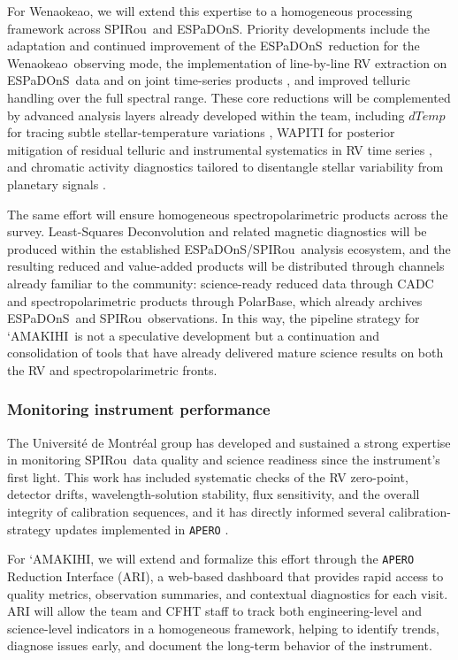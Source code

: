 \documentclass[
    traditabstract,
    longauth,
    onecolumn,
]{aa}
\def \amakihi{`AMAKIHI}
\def \spi{SPIRou}
\def \esp{ESPaDOnS}
\def \wena{Wenaokeao}
\begin{document}
For \wena, we will extend this expertise to a homogeneous processing framework across \spi\ and \esp. Priority developments include the adaptation and continued improvement of the \esp\ reduction for the \wena\ observing mode, the implementation of line-by-line RV extraction on \esp\ data and on joint time-series products \citep{artigau_line-by-line_2022}, and improved telluric handling over the full spectral range. These core reductions will be complemented by advanced analysis layers already developed within the team, including $dTemp$ for tracing subtle stellar-temperature variations \citep{artigau_measuring_2024}, WAPITI for posterior mitigation of residual telluric and instrumental systematics in RV time series \citep{ould-elhkim_wapiti_2023}, and chromatic activity diagnostics tailored to disentangle stellar variability from planetary signals \citep{larue2025}.

The same effort will ensure homogeneous spectropolarimetric products across the survey. Least-Squares Deconvolution and related magnetic diagnostics will be produced within the established \esp/\spi\ analysis ecosystem, and the resulting reduced and value-added products will be distributed through channels already familiar to the community: science-ready reduced data through CADC and spectropolarimetric products through PolarBase, which already archives \esp\ and \spi\ observations. In this way, the pipeline strategy for \amakihi\ is not a speculative development but a continuation and consolidation of tools that have already delivered mature science results on both the RV and spectropolarimetric fronts.


\subsubsection{Monitoring instrument performance}

The Universit\'e de Montr\'eal group has developed and sustained a strong expertise in monitoring \spi\ data quality and science readiness since the instrument's first light. This work has included systematic checks of the RV zero-point, detector drifts, wavelength-solution stability, flux sensitivity, and the overall integrity of calibration sequences, and it has directly informed several calibration-strategy updates implemented in \texttt{APERO} \citep{cook_apero_2022}.

For \amakihi, we will extend and formalize this effort through the \texttt{APERO} Reduction Interface (ARI), a web-based dashboard that provides rapid access to quality metrics, observation summaries, and contextual diagnostics for each visit. ARI will allow the team and CFHT staff to track both engineering-level and science-level indicators in a homogeneous framework, helping to identify trends, diagnose issues early, and document the long-term behavior of the instrument.
\end{document}
